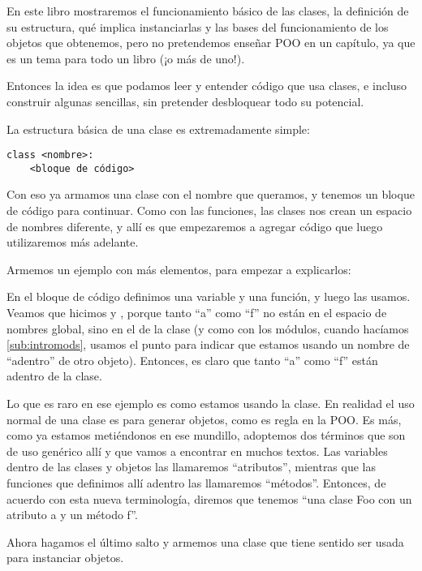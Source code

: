 En este libro mostraremos el funcionamiento básico de las clases, la definición de su estructura, qué implica instanciarlas y las bases del funcionamiento de los objetos que obtenemos, pero no pretendemos enseñar POO en un capítulo, ya que es un tema para todo un libro (¡o más de uno!).

Entonces la idea es que podamos leer y entender código que usa clases, e incluso construir algunas sencillas, sin pretender desbloquear todo su potencial.

La estructura básica de una clase es extremadamente simple:

\begin{verbatim}
class <nombre>:
    <bloque de código>
\end{verbatim}

Con eso ya armamos una clase con el nombre que queramos, y tenemos un bloque de código para continuar. Como con las funciones, las clases nos crean un espacio de nombres diferente, y allí es que empezaremos a agregar código que luego utilizaremos más adelante.

Armemos un ejemplo con más elementos, para empezar a explicarlos:


En el bloque de código definimos una variable y una función, y luego las usamos. Veamos que hicimos  y , porque tanto ``a'' como ``f'' no están en el espacio de nombres global, sino en el de la clase (y como con los módulos, cuando hacíamos  \ref{sub:intromods}, usamos el punto para indicar que estamos usando un nombre de ``adentro'' de otro objeto). Entonces, es claro que tanto ``a'' como ``f'' están adentro de la clase. 

Lo que es raro en ese ejemplo es como estamos usando la clase. En realidad el uso normal de una clase es para generar objetos, como es regla en la POO. Es más, como ya estamos metiéndonos en ese mundillo, adoptemos dos términos que son de uso genérico allí y que vamos a encontrar en muchos textos. Las variables dentro de las clases y objetos las llamaremos ``atributos'', mientras que las funciones que definimos allí adentro las llamaremos ``métodos''. Entonces, de acuerdo con esta nueva terminología, diremos que tenemos ``una clase Foo con un atributo a y un método f''.

Ahora hagamos el último salto y armemos una clase que tiene sentido ser usada para instanciar objetos.

